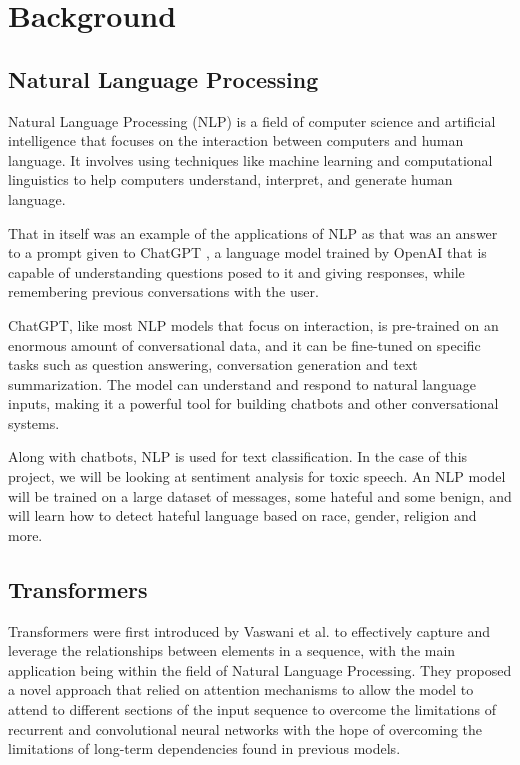 \chapter{Background}

\section{Natural Language Processing}

Natural Language Processing (NLP) is a field of computer science and artificial intelligence that focuses on the interaction between computers and human language. It involves using techniques like machine learning and computational linguistics to help computers understand, interpret, and generate human language.

That in itself was an example of the applications of NLP as that was an answer to a prompt given to ChatGPT \cite{ChatGPT}, a language model trained by OpenAI that is capable of understanding questions posed to it and giving responses, while remembering previous conversations with the user.

ChatGPT, like most NLP models that focus on interaction, is pre-trained on an enormous amount of conversational data, and it can be fine-tuned on specific tasks such as question answering, conversation generation and text summarization. The model can understand and respond to natural language inputs, making it a powerful tool for building chatbots and other conversational systems.

Along with chatbots, NLP is used for text classification. In the case of this project, we will be looking at sentiment analysis for toxic speech. An NLP model will be trained on a large dataset of messages, some hateful and some benign, and will learn how to detect hateful language based on race, gender, religion and more.

\section{Transformers}

Transformers were first introduced by Vaswani et al. \cite{transformer_paper} to effectively capture and leverage the relationships between elements in a sequence, with the main application being within the field of Natural Language Processing. They proposed a novel approach that relied on attention mechanisms to allow the model to attend to different sections of the input sequence to overcome the limitations of recurrent and convolutional neural networks with the hope of overcoming the limitations of long-term dependencies found in previous models.

